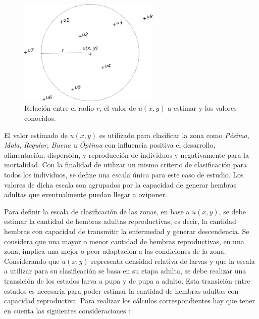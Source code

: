 \begin{figure}[!hptb]
\centering
\includegraphics[width=0.6\textwidth]{capitulo-4/graphics/zonificacion.png}
\caption{\label{fig:cap4-zonficiacion} Relación entre el radio $r$, el valor de $u(x, y)$ a estimar y los valores conocidos.}
\end{figure}

El valor estimado de $u(x,y)$ es utilizado para clasificar la zona como \textit{Pésima},
\textit{Mala}, \textit{Regular}, \textit{Buena} u \textit{Óptima} con influencia positiva el
desarrollo, alimentación, dispersión, y reproducción de individuos y negativamente para la
mortalidad. Con la finalidad de utilizar un mismo criterio de clasificación para todos los
individuos, se define una escala única para este caso de estudio. Los valores de dicha escala son
agrupados por la capacidad de generar hembras adultas que eventualmente puedan llegar a oviponer.

Para definir la escala de clasificación de las zonas, en base a $u(x, y)$, se debe estimar la
cantidad de hembras adultas reproductivas, es decir, la cantidad hembras con capacidad de
transmitir la enfermedad y generar descendencia. Se considera que una mayor o menor cantidad de
hembras reproductivas, en una zona, implica una mejor o peor adaptación a las condiciones de la zona. Considerando que $u(x, y)$ representa densidad relativa de larvas y que la escala a utilizar
para su clasificación se basa en su etapa adulta, se debe realizar una transición de los estados
larva a pupa y de pupa a adulto. Esta transición entre estados es necesaria para poder estimar la
cantidad de hembras adultas con capacidad reproductiva. Para realizar los cálculos
correspondientes hay que tener en cuenta las siguientes consideraciones :

